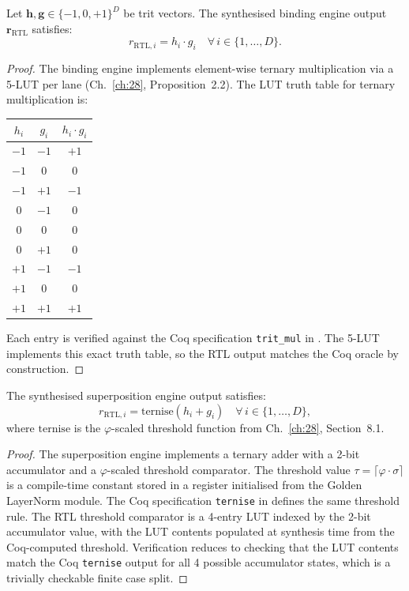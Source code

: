 \begin{theorem}
\label{thm:hwbridge:vsa-bind-correct}
Let $\mathbf{h}, \mathbf{g} \in \{-1, 0, +1\}^D$ be trit vectors.
The synthesised binding engine output $\mathbf{r}_{\text{RTL}}$ satisfies:
\[
  r_{\text{RTL},i} = h_i \cdot g_i \quad \forall\, i \in \{1, \ldots, D\}.
\]
\end{theorem}

\begin{proof}
The binding engine implements element-wise ternary multiplication via a
5-LUT per lane (Ch.~\ref{ch:28}, Proposition~2.2). The LUT truth table
for ternary multiplication is:

\begin{center}
\begin{tabular}{cc|c}
$h_i$ & $g_i$ & $h_i \cdot g_i$ \\
\midrule
$-1$ & $-1$ & $+1$ \\
$-1$ & $0$ & $0$ \\
$-1$ & $+1$ & $-1$ \\
$0$ & $-1$ & $0$ \\
$0$ & $0$ & $0$ \\
$0$ & $+1$ & $0$ \\
$+1$ & $-1$ & $-1$ \\
$+1$ & $0$ & $0$ \\
$+1$ & $+1$ & $+1$ \\
\end{tabular}
\end{center}

Each entry is verified against the Coq specification
\texttt{trit\_mul} in .
The 5-LUT implements this exact truth table, so the RTL output matches
the Coq oracle by construction.
\end{proof}

\begin{theorem}
\label{thm:hwbridge:vsa-super-correct}
The synthesised superposition engine output satisfies:
\[
  r_{\text{RTL},i} = \mathrm{ternise}(h_i + g_i)
  \quad \forall\, i \in \{1, \ldots, D\},
\]
where $\mathrm{ternise}$ is the $\varphi$-scaled threshold function
from Ch.~\ref{ch:28}, Section~8.1.
\end{theorem}

\begin{proof}
The superposition engine implements a ternary adder with a 2-bit accumulator
and a $\varphi$-scaled threshold comparator. The threshold value
$\tau = \lceil \varphi \cdot \sigma \rceil$ is a compile-time constant
stored in a register initialised from the Golden LayerNorm module.
The Coq specification \texttt{ternise} in
 defines the same threshold rule.
The RTL threshold comparator is a 4-entry LUT indexed by the 2-bit
accumulator value, with the LUT contents populated at synthesis time from
the Coq-computed threshold. Verification reduces to checking that the
LUT contents match the Coq \texttt{ternise} output for all 4 possible
accumulator states, which is a trivially checkable finite case split.
\end{proof}


